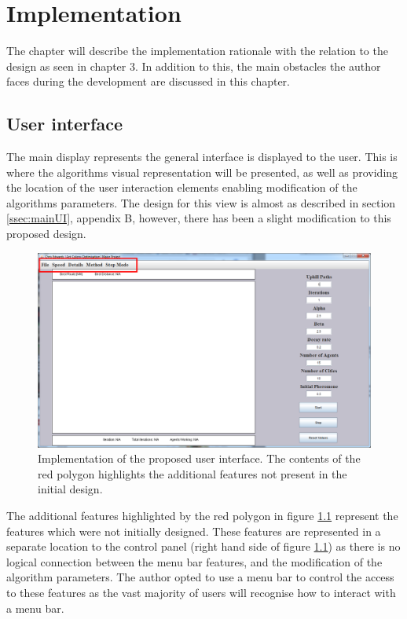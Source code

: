 \chapter{Implementation}

The chapter will describe the implementation rationale with the relation to the design as seen in chapter 3. In addition to this, the main obstacles the author faces during the development are discussed in this chapter.

\section{User interface}
\label{mainimp}
The main display represents the general interface is displayed to the user. This is where the algorithms visual representation will be presented, as well as providing the location of the user interaction elements enabling modification of the algorithms parameters. The design for this view is almost as described in section \ref{ssec:mainUI}, appendix B, however, there has been a slight modification to this proposed design.

\begin{figure}[H]
\centering
\includegraphics[scale=0.3]{Images/chapter4/displayFrame}
\caption[Implementation of the User Interface]{Implementation of the proposed user interface. The contents of the red polygon highlights the additional features not present in the initial design.}
\label{fig:displayFrameImp}
\end{figure}

The additional features highlighted by the red polygon in figure \ref{fig:displayFrameImp} represent the features which were not initially designed. These features are represented in a separate location to the control panel (right hand side of figure \ref{fig:displayFrameImp}) as there is no logical connection between the menu bar features, and the modification of the algorithm parameters. The author opted to use a menu bar to control the access to these features as the vast majority of users will recognise how to interact with a menu bar.

